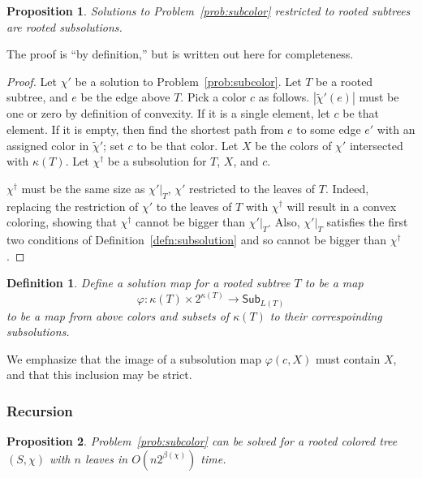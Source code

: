 \documentclass{amsart}
\newcommand{\col}{\chi}
\newcommand{\subcol}{\chi'}
\newcommand{\altcol}{\chi^{\dag}}
\newcommand{\subcolt}{\tilde{\chi}'}
\newcommand{\subcolS}{\mathsf{Sub}}
\newcommand{\subcolST}{\subcolS_{L(T)}}
\newcommand{\cut}{\kappa}
\newcommand{\bad}{\beta}
\newtheorem{prop}{Proposition}
\newtheorem{defn}{Definition}
\begin{document}
\begin{prop}
  \label{prop:subsolution}
  Solutions to Problem~\ref{prob:subcolor} restricted to rooted subtrees are rooted subsolutions.
\end{prop}

The proof is ``by definition,'' but is written out here for completeness.

\begin{proof}
  Let $\subcol$ be a solution to Problem~\ref{prob:subcolor}.
  Let $T$ be a rooted subtree, and $e$ be the edge above $T$.
  Pick a color $c$ as follows.
  $|\subcolt(e)|$ must be one or zero by definition of convexity.
  If it is a single element, let $c$ be that element.
  If it is empty, then find the shortest path from $e$ to some edge $e'$ with an assigned color in $\subcolt$; set $c$ to be that color.
  Let $X$ be the colors of $\subcol$ intersected with $\cut(T)$.
  Let $\altcol$ be a subsolution for $T$, $X$, and $c$.

  $\altcol$ must be the same size as $\subcol|_T$, $\subcol$ restricted to the leaves of $T$.
  Indeed, replacing the restriction of $\subcol$ to the leaves of $T$ with $\altcol$ will result in a convex coloring, showing that $\altcol$ cannot be bigger than $\subcol|_T$.
  Also, $\subcol|_T$ satisfies the first two conditions of Definition~\ref{defn:subsolution} and so cannot be bigger than $\altcol$.
\end{proof}

\begin{defn}
  Define a solution map for a rooted subtree $T$ to be a map
  \[
    \varphi: \cut(T) \times 2^{\cut(T)} \rightarrow \subcolST
  \]
  to be a map from above colors and subsets of $\cut(T)$ to their correspoinding subsolutions.
\end{defn}
We emphasize that the image of a subsolution map $\varphi(c,X)$ must contain $X$, and that this inclusion may be strict.


\subsubsection{Recursion}

\begin{prop}
Problem~\ref{prob:subcolor} can be solved for a rooted colored tree $(S, \col)$ with $n$ leaves in $O(n 2^{\bad(\col)})$ time.
\end{prop}
\end{document}
